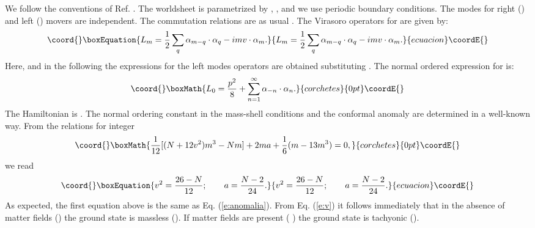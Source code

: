 \documentclass[a4paper,aps,prd,twocolumn,groupedaddress]{revtex4}
\begin{document}
We follow the conventions of Ref. \cite{gsw}.  The worldsheet is
parametrized by \myHighlight{$(\tau,\sigma)$}\coordHE{}, \myHighlight{$-\infty < \tau < \infty$}\coordHE{}, \myHighlight{$0\le
\sigma \le \pi$}\coordHE{} and we use periodic boundary conditions.  The modes
for right (\coordHE{}) and left (\coordHE{}) movers are
independent. The commutation relations are as usual
\coordHE{}. The Virasoro operators for \coordHE{} are
given by:
\begin{equation}\coord{}\boxEquation{\label{e:vira}
L_m = \frac{1}{2}\sum_q \alpha_{m-q}\cdot\alpha_q -imv\cdot 
\alpha_m.
}{L_m = \frac{1}{2}\sum_q \alpha_{m-q}\cdot\alpha_q -imv\cdot 
\alpha_m.
}{ecuacion}\coordE{}\end{equation}
Here, and in the following the expressions for the left modes
operators are obtained substituting \coordHE{}. The
normal ordered expression for \coordHE{} is:
\begin{displaymath}\coord{}\boxMath{
L_0 = \frac{p^2}{8} +\sum_{n=1}^\infty \alpha_{-n}\cdot \alpha_n.
}{corchetes}{0pt}\coordE{}\end{displaymath}
The Hamiltonian is \coordHE{}.  The normal ordering
constant \coordHE{} in the mass-shell conditions \coordHE{} and the conformal anomaly are
determined in 
a well-known way. From the relations for integer \coordHE{}
\begin{displaymath}\coord{}\boxMath{
\frac{1}{12}[(N+12v^2)m^3-Nm] +2ma+\frac{1}{6}(m-13m^3)=0,
}{corchetes}{0pt}\coordE{}\end{displaymath}
we read
\begin{equation}\coord{}\boxEquation{\label{e:v}
v^2 = \frac{26-N}{12}; \qquad a = \frac{N-2}{24}.
}{v^2 = \frac{26-N}{12}; \qquad a = \frac{N-2}{24}.
}{ecuacion}\coordE{}\end{equation}
As expected, the first equation above is the same as
Eq. (\ref{e:anomalia}). From Eq. (\ref{e:v}) it follows immediately that
in the absence of matter fields (\coordHE{}) the ground state is massless
(\coordHE{}). If matter fields are present ( \coordHE{}) the ground
state is tachyonic (\coordHE{}).
\end{document}

